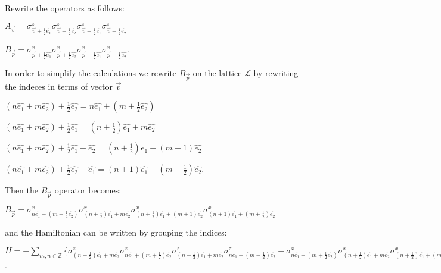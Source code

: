 \documentclass{Configuration_Files/PoliMi3i_thesis}
\begin{document}
Rewrite the operators as follows: \newline

\begin{center}
	
	$A_{\vec{v}} = \sigma^z_{\vec{v}+\frac{1}{2}\hat{e_1}} \sigma^z_{\vec{v}+\frac{1}{2}\hat{e_2}} \sigma^z_{\vec{v}-\frac{1}{2}\hat{e_1}} \sigma^z_{\vec{v}-\frac{1}{2}\hat{e_2}}$ 
	
	$B_{\vec{p}} = \sigma^x_{\vec{p}+\frac{1}{2}\hat{e_1}} \sigma^x_{\vec{p}+\frac{1}{2}\hat{e_2}} \sigma^x_{\vec{p}-\frac{1}{2}\hat{e_1}} \sigma^x_{\vec{p}-\frac{1}{2}\hat{e_2}}$.
	
\end{center}

In order to simplify the calculations we rewrite $B_{\vec{p}}$ on the lattice $\mathcal{L}$ by rewriting the indeces in terms of vector $\vec{v}$ \newline

\begin{center}
	$(n\hat{e_1} + m\hat{e_2}) + \frac{1}{2}\hat{e_2}= n\hat{e_1} + (m+\frac{1}{2}\hat{e_2})$
	
	$(n\hat{e_1} + m\hat{e_2}) + \frac{1}{2}\hat{e_1}= (n+ \frac{1}{2})\hat{e_1} + m\hat{e_2}$
	
	$(n\hat{e_1} + m\hat{e_2}) + \frac{1}{2}\hat{e_1}+\hat{e_2}= (n+ \frac{1}{2})\hat{e_1} + (m + 1)\hat{e_2}$
	
	$(n\hat{e_1} + m\hat{e_2}) + \frac{1}{2}\hat{e_2}+\hat{e_1}= (n+ 1)\hat{e_1} + (m + \frac{1}{2})\hat{e_2}$.
\end{center}


Then the $B_{\vec{p}}$ operator becomes: \newline

\begin{center}
	
	$B_{\vec{p}} = \sigma^x_{n\hat{e_1} + (m+\frac{1}{2}\hat{e_2})} \sigma^x_{(n+ \frac{1}{2})\hat{e_1} + m\hat{e_2}} \sigma^x_{(n+ \frac{1}{2})\hat{e_1} + (m + 1)\hat{e_2}} \sigma^x_{(n+ 1)\hat{e_1} + (m + \frac{1}{2})\hat{e_2}}$ \newline
	
\end{center}

and the Hamiltonian can be written by grouping the indices: \newline

\begin{center}
	
	$H = - \sum_{m,n \in \mathbb{Z}} \{ 
	\sigma^z_{(n+\frac{1}{2})\hat{e_1} + m\hat{e_2}} \sigma^z_{n\hat{e_1}+(m+\frac{1}{2})\hat{e_2}} \sigma^z_{(n-\frac{1}{2})\hat{e_1} + m\hat{e_2}} \sigma^z_{n\hat{e_1}+(m-\frac{1}{2})\hat{e_2}} +
	\sigma^x_{n\hat{e_1} + (m+\frac{1}{2}\hat{e_2})} \sigma^x_{(n+ \frac{1}{2})\hat{e_1} + m\hat{e_2}} \sigma^x_{(n+ \frac{1}{2})\hat{e_1} + (m + 1)\hat{e_2}} \sigma^x_{(n+ 1)\hat{e_1} + (m + \frac{1}{2})\hat{e_2}} \} $.\newline
	
\end{center}
\end{document}
